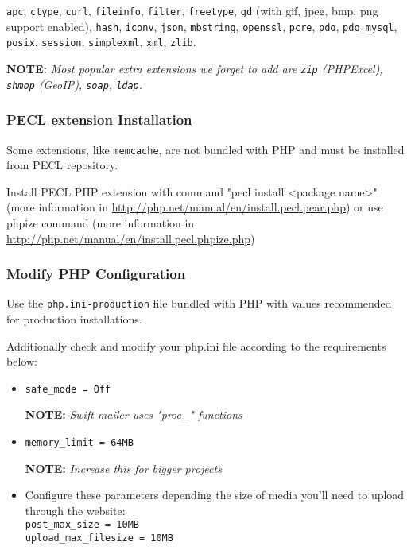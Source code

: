 \documentclass[12pt]{article}
\newcommand{\vigShowNotes}{1}
\newcommand{\note}[1]{
\textbf{NOTE:} 
\textit{#1}
}
\begin{document}
\texttt{apc}, \texttt{ctype}, \texttt{curl}, \texttt{fileinfo}, \texttt{filter}, \texttt{freetype}, \texttt{gd} (with gif, jpeg, bmp, png support enabled), \texttt{hash}, \texttt{iconv}, \texttt{json}, \texttt{mbstring}, \texttt{openssl}, \texttt{pcre}, \texttt{pdo}, \texttt{pdo\_mysql}, \texttt{posix}, \texttt{session}, \texttt{simplexml}, \texttt{xml}, \texttt{zlib}.

\note{Most popular extra extensions we forget to add are \texttt{zip} (PHPExcel), \texttt{shmop} (GeoIP), \texttt{soap}, \texttt{ldap}.}

\subsubsection{PECL extension Installation}
Some extensions, like \texttt{memcache}, are not bundled with PHP and must be installed from PECL repository.

Install PECL PHP extension with command "pecl install {\textless}package name{\textgreater}" (more information in \url{http://php.net/manual/en/install.pecl.pear.php}) or use phpize command (more information in \url{http://php.net/manual/en/install.pecl.phpize.php})

\subsubsection{Modify PHP Configuration}

Use the \texttt{php.ini-production} file bundled with PHP with values recommended for production installations.

Additionally check and modify your php.ini file according to the requirements below:

\begin{itemize}
	\item \texttt{safe\_mode = Off}
	
	\note{Swift mailer uses "proc\_\*" functions}
	
	\item \texttt{memory\_limit = 64MB}
	
	\note{Increase this for bigger projects}
	
	\item Configure these parameters depending the size of media you'll need to upload through the website:
	\\ \texttt{post\_max\_size = 10MB}
	\\ \texttt{upload\_max\_filesize = 10MB}
	
\end{itemize}
\end{document}

